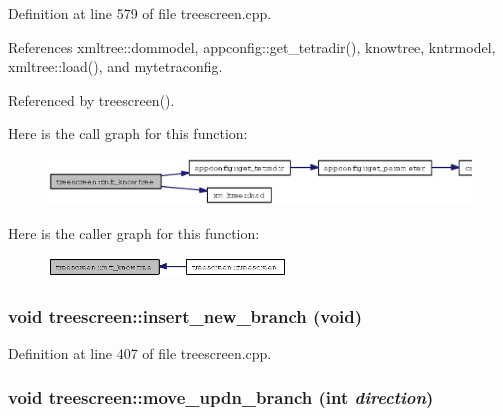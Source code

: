 Definition at line 579 of file treescreen.cpp.

References xmltree::dommodel, appconfig::get\_\-tetradir(), knowtree, kntrmodel, xmltree::load(), and mytetraconfig.

Referenced by treescreen().

Here is the call graph for this function:\begin{figure}[H]
\begin{center}
\leavevmode
\includegraphics[width=331pt]{classtreescreen_d325ba7cf9bd91d3e511aa2a5374293c_cgraph}
\end{center}
\end{figure}


Here is the caller graph for this function:\begin{figure}[H]
\begin{center}
\leavevmode
\includegraphics[width=179pt]{classtreescreen_d325ba7cf9bd91d3e511aa2a5374293c_icgraph}
\end{center}
\end{figure}
\subsubsection{\setlength{\rightskip}{0pt plus 5cm}void treescreen::insert\_\-new\_\-branch (void)\hspace{0.3cm}{\tt  [private]}}\label{classtreescreen_b41c15b069309faebf37cb1b0ad245f1}




Definition at line 407 of file treescreen.cpp.
\subsubsection{\setlength{\rightskip}{0pt plus 5cm}void treescreen::move\_\-updn\_\-branch (int {\em direction})\hspace{0.3cm}{\tt  [private]}}\label{classtreescreen_773a34b2a15964d0101b142b54da3986}




